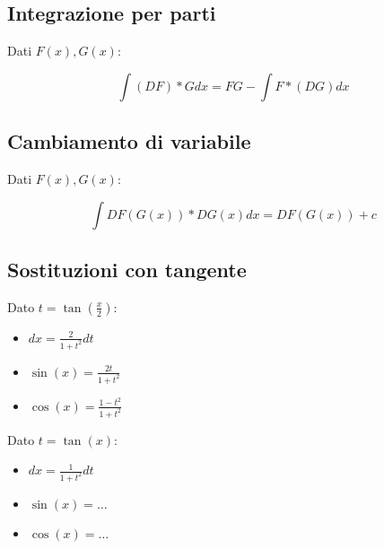 \documentclass{subfiles}
\begin{document}
\subsection{Integrazione per parti}

Dati $F(x), G(x)$:

$$
\int (DF) * G dx = FG - \int F * (DG) dx
$$

\subsection{Cambiamento di variabile}

Dati $F(x), G(x)$:

$$
\int DF(G(x)) * DG(x) dx = DF(G(x)) + c
$$

\subsection{Sostituzioni con tangente}

Dato $t = \tan(\frac{x}{2})$:

\begin{itemize}
    \item $dx = \frac{2}{1 + t^2}dt$
    \item $\sin(x) = \frac{2t}{1 + t^2}$
    \item $\cos(x) = \frac{1 - t^2}{1 + t^2}$
\end{itemize}

\noindent
Dato $t = \tan(x)$:

\begin{itemize}
    \item $dx = \frac{1}{1 + t^2}dt$
    \item $\sin(x) = \dots$
    \item $\cos(x) = \dots$
\end{itemize}
\end{document}
